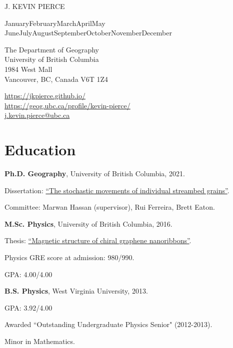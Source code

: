 \documentclass[11pt,letterpaper]{article}
\def\name{J. Kevin Pierce}
\newcommand{\titlefont}[1]{{\titleface\Large\MakeUppercase{#1}}}
\renewenvironment{itemize}{
	\begin{list}{}{
			\setlength{\leftmargin}{1.5em}
			\setlength{\rightmargin}{0em}  %
			\setlength{\itemsep}{0.25em}
			\setlength{\parskip}{0pt}
			\setlength{\parsep}{0.25em}
		}
	}{
	\end{list}
}
\renewenvironment{itemize}{
	\begin{list}{}{
			\setlength{\leftmargin}{1.5em}
			\setlength{\itemsep}{0.25em}
			\setlength{\parskip}{0pt}
			\setlength{\parsep}{0.25em}
		}
	}{
	\end{list}
}
\renewcommand{\today}{\ifcase \month \or January\or February\or March\or April\or May%
	\or June\or July\or August\or September\or October\or November\or December\fi%
	\space \number \year}
\begin{document}
	
	\titlefont{\name}
	
	
	\bigskip
	\today
	
	\bigskip
	\begin{minipage}[t]{0.495\textwidth}
		The Department of Geography \\
		University of British Columbia \\
		1984 West Mall \\
		Vancouver, BC, Canada  V6T 1Z4
	\end{minipage}
	\begin{minipage}[t]{0.495\textwidth}
		\href{https://jkpierce.github.io/}{https://jkpierce.github.io/} \\
		\href{https://geog.ubc.ca/profile/kevin-pierce/}{https://geog.ubc.ca/profile/kevin-pierce/}\\
		\href{mailto:j.kevin.pierce@ubc.ca}{j.kevin.pierce@ubc.ca}
	\end{minipage}
	
	\section*{Education}
	
	\begin{itemize}
		\item {\bf Ph.D. Geography}, University of British Columbia, 2021.
		\begin{itemize}
			\item Dissertation: \href{https://open.library.ubc.ca/soa/cIRcle/collections/ubctheses/24/items/1.0402359}{``The stochastic movements of individual streambed grains''}.
			\item Committee: Marwan Hassan (supervisor), Rui Ferreira, Brett Eaton.
		\end{itemize}
		\item {\bf M.Sc. Physics}, University of British Columbia, 2016.
		\begin{itemize}
			\item Thesis: \href{https://open.library.ubc.ca/soa/cIRcle/collections/ubctheses/24/items/1.0300170}{``Magnetic structure of chiral graphene nanoribbons''}.
			\item Physics GRE score at admission: 980/990.
			\item GPA: 4.00/4.00
		\end{itemize}
		\item {\bf B.S. Physics},
		West Virginia University, 2013.
		\begin{itemize}
			\item GPA: 3.92/4.00
			\item Awarded ``Outstanding Undergraduate Physics Senior" (2012-2013).
			\item Minor in Mathematics.
		\end{itemize}
	\end{itemize}
	
\end{document}
